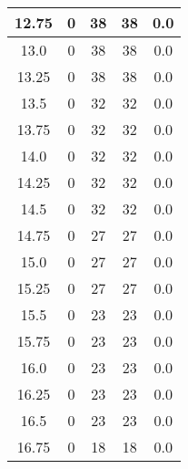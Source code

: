 \documentclass[letterpaper, 12pt]{article}
\begin{document}
\begin{longtable}{|c|c|c|c|c|}
\hline
12.75 & 0 & 38 & 38 & 0.0 \\
\hline
13.0 & 0 & 38 & 38 & 0.0 \\
\hline
13.25 & 0 & 38 & 38 & 0.0 \\
\hline
13.5 & 0 & 32 & 32 & 0.0 \\
\hline
13.75 & 0 & 32 & 32 & 0.0 \\
\hline
14.0 & 0 & 32 & 32 & 0.0 \\
\hline
14.25 & 0 & 32 & 32 & 0.0 \\
\hline
14.5 & 0 & 32 & 32 & 0.0 \\
\hline
14.75 & 0 & 27 & 27 & 0.0 \\
\hline
15.0 & 0 & 27 & 27 & 0.0 \\
\hline
15.25 & 0 & 27 & 27 & 0.0 \\
\hline
15.5 & 0 & 23 & 23 & 0.0 \\
\hline
15.75 & 0 & 23 & 23 & 0.0 \\
\hline
16.0 & 0 & 23 & 23 & 0.0 \\
\hline
16.25 & 0 & 23 & 23 & 0.0 \\
\hline
16.5 & 0 & 23 & 23 & 0.0 \\
\hline
16.75 & 0 & 18 & 18 & 0.0 \\
\hline
\end{longtable}
\end{document}
